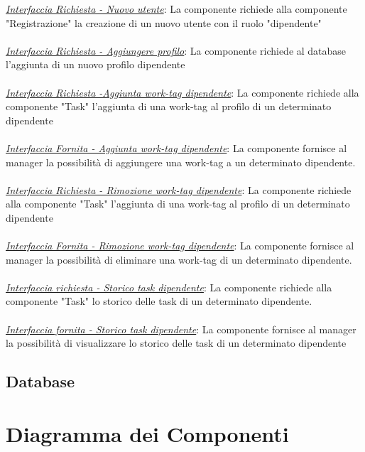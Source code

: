 \documentclass{report}
\begin{document}
\uline{\textit{Interfaccia Richiesta - Nuovo utente}}: 
La componente richiede alla componente "Registrazione" la creazione di un nuovo utente con il ruolo "dipendente"\\\\
\uline{\textit{Interfaccia Richiesta - Aggiungere profilo}}:
La componente richiede al database l'aggiunta di un nuovo profilo dipendente\\\\
\uline{\textit{Interfaccia Richiesta -Aggiunta work-tag dipendente}}:
La componente richiede alla componente "Task" l'aggiunta di una work-tag al profilo di un determinato dipendente\\\\
\uline{\textit{Interfaccia Fornita - Aggiunta work-tag dipendente}}:
La componente fornisce al manager la possibilità di aggiungere una work-tag a un determinato dipendente.\\\\
\uline{\textit{Interfaccia Richiesta - Rimozione work-tag dipendente}}:
La componente richiede alla componente "Task" l'aggiunta di una work-tag al profilo di un determinato dipendente\\\\
\uline{\textit{Interfaccia Fornita - Rimozione work-tag dipendente}}:
La componente fornisce al manager la possibilità di eliminare una work-tag di un determinato dipendente.\\\\
\uline{\textit{Interfaccia richiesta - Storico task dipendente}}:
La componente richiede alla componente "Task" lo storico delle task di un determinato dipendente.\\\\
\uline{\textit{Interfaccia fornita - Storico task dipendente}}:
La componente fornisce al manager la possibilità di visualizzare lo storico delle task di un determinato dipendente

\subsection{Database}


\section{Diagramma dei Componenti}
\end{document}
